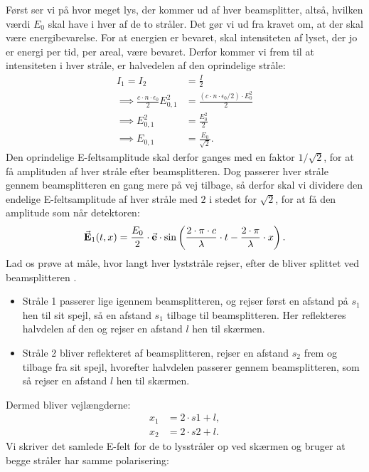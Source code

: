 \documentclass[crop=false, class=memoir]{standalone}
\begin{document}
Først ser vi på hvor meget lys, der kommer ud af hver beamsplitter, altså, hvilken værdi $E_0$ skal have i hver af de to stråler. Det gør vi ud fra kravet om, at der skal være energibevarelse. For at energien er bevaret, skal intensiteten af lyset, der jo er energi per tid, per areal, være bevaret. Derfor kommer vi frem til at intensiteten i hver stråle, er halvedelen af den oprindelige stråle:
%
\begin{align}
    I_1 = I_2 &= \frac{I}{2} \\
    \implies \frac{c\cdot n \cdot \epsilon_0}{2} E_{0,1}^2 &= \frac{(c\cdot n \cdot \epsilon_0/2)\cdot E_{0}^2}{2} \\ 
    \implies E_{0, 1}^2 &= \frac{E_0^2}{2} \\
    \implies E_{0, 1} &= \frac{E_0}{\sqrt{2}}.
\end{align}
%
Den oprindelige E-feltsamplitude skal derfor ganges med en faktor $1/\sqrt{2}$, for at få amplituden af hver stråle efter beamsplitteren. Dog passerer hver stråle gennem beamsplitteren en gang mere på vej tilbage, så derfor skal vi dividere den endelige E-feltsamplitude af hver stråle med $2$ i stedet for $\sqrt{2}$, for at få den amplitude som når detektoren:
%
\begin{align}
    \va{E}_{1}(t, x) = \frac{E_0}{2} \cdot \va{e} \cdot \sin\left(\frac{2\cdot\pi\cdot c}{\lambda} \cdot t - \frac{2\cdot\pi}{\lambda} \cdot x\right).
\end{align}
%
Lad os prøve at måle, hvor langt hver lyststråle rejser, efter de bliver splittet ved beamsplitteren . 
%
\begin{itemize}
    \item Stråle 1 passerer lige igennem beamsplitteren, og rejser først en afstand på $s_1$ hen til sit spejl, så en afstand $s_1$ tilbage til beamsplitteren. Her reflekteres halvdelen af den og rejser en afstand $l$ hen til skærmen.
    \item Stråle 2 bliver reflekteret af beamsplitteren, rejser en afstand $s_2$ frem og tilbage fra sit spejl, hvorefter halvdelen passerer gennem beamsplitteren, som så rejser en afstand $l$ hen til skærmen.
\end{itemize}
%
Dermed bliver vejlængderne:
%
\begin{align}\label{laser:eq:vejlangde}
    x_1 &= 2\cdot s1 + l,\\
    x_2 &= 2\cdot s2 + l.
\end{align}
%
Vi skriver det samlede E-felt for de to lysstråler op ved skærmen  og bruger at begge stråler har samme polarisering:
\end{document}

